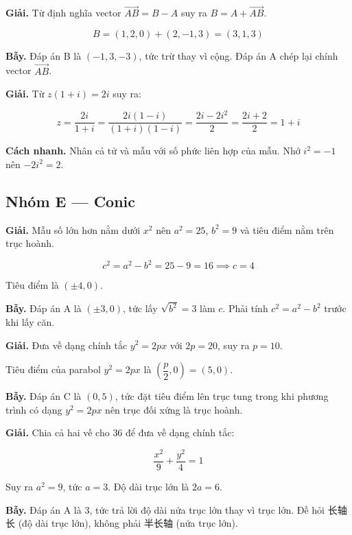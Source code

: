 \documentclass[11pt, a4paper]{article}
\begin{document}
\begin{dapan}[18 — Đáp án D]
\textbf{Giải.} Từ định nghĩa vector $\overrightarrow{AB} = B - A$ suy ra $B = A + \overrightarrow{AB}$.

$$B = (1, 2, 0) + (2, -1, 3) = (3, 1, 3)$$

\textbf{Bẫy.} Đáp án B là $(-1, 3, -3)$, tức trừ thay vì cộng. Đáp án A chép lại chính vector $\overrightarrow{AB}$.
\end{dapan}

\begin{dapan}[19 — Đáp án B]
\textbf{Giải.} Từ $z(1+i) = 2i$ suy ra:

$$z = \frac{2i}{1+i} = \frac{2i(1-i)}{(1+i)(1-i)} = \frac{2i - 2i^2}{2} = \frac{2i + 2}{2} = 1 + i$$

\textbf{Cách nhanh.} Nhân cả tử và mẫu với số phức liên hợp của mẫu. Nhớ $i^2 = -1$ nên $-2i^2 = 2$.
\end{dapan}

\subsection*{Nhóm E — Conic}

\begin{dapan}[20 — Đáp án C]
\textbf{Giải.} Mẫu số lớn hơn nằm dưới $x^2$ nên $a^2 = 25$, $b^2 = 9$ và tiêu điểm nằm trên trục hoành.

$$c^2 = a^2 - b^2 = 25 - 9 = 16 \implies c = 4$$

Tiêu điểm là $(\pm 4, 0)$.

\textbf{Bẫy.} Đáp án A là $(\pm 3, 0)$, tức lấy $\sqrt{b^2} = 3$ làm $c$. Phải tính $c^2 = a^2 - b^2$ trước khi lấy căn.
\end{dapan}

\begin{dapan}[21 — Đáp án A]
\textbf{Giải.} Đưa về dạng chính tắc $y^2 = 2px$ với $2p = 20$, suy ra $p = 10$.

Tiêu điểm của parabol $y^2 = 2px$ là $\left(\dfrac{p}{2}, 0\right) = (5, 0)$.

\textbf{Bẫy.} Đáp án C là $(0,5)$, tức đặt tiêu điểm lên trục tung trong khi phương trình có dạng $y^2 = 2px$ nên trục đối xứng là trục hoành.
\end{dapan}

\begin{dapan}[22 — Đáp án C]
\textbf{Giải.} Chia cả hai vế cho $36$ để đưa về dạng chính tắc:

$$\frac{x^2}{9} + \frac{y^2}{4} = 1$$

Suy ra $a^2 = 9$, tức $a = 3$. Độ dài trục lớn là $2a = 6$.

\textbf{Bẫy.} Đáp án A là $3$, tức trả lời độ dài nửa trục lớn thay vì trục lớn. Đề hỏi 长轴长 (độ dài trục lớn), không phải 半长轴 (nửa trục lớn).
\end{dapan}
\end{document}
